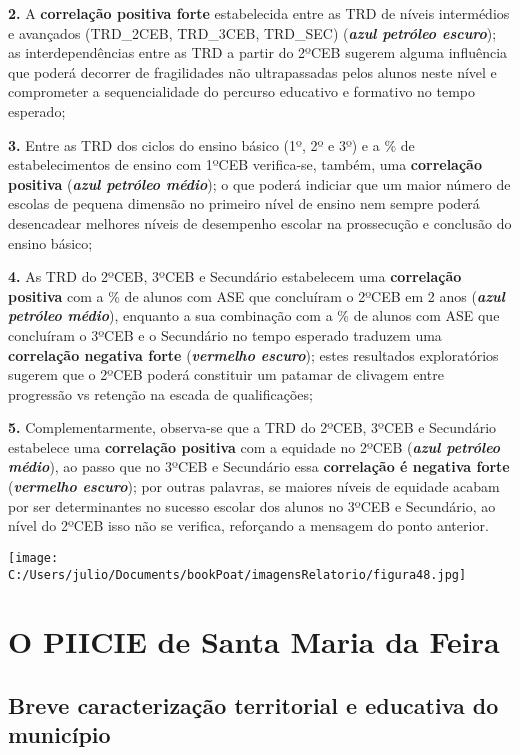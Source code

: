 \documentclass[
]{book}
\begin{document}
\textbf{2.} A \textbf{correlação positiva forte} estabelecida entre as TRD de níveis intermédios e avançados (TRD\_2CEB, TRD\_3CEB, TRD\_SEC) (\textbf{\emph{azul petróleo escuro}}); as interdependências entre as TRD a partir do 2ºCEB sugerem alguma influência que poderá decorrer de fragilidades não ultrapassadas pelos alunos neste nível e comprometer a sequencialidade do percurso educativo e formativo no tempo esperado;

\textbf{3.} Entre as TRD dos ciclos do ensino básico (1º, 2º e 3º) e a \% de estabelecimentos de ensino com 1ºCEB verifica-se, também, uma \textbf{correlação positiva} (\textbf{\emph{azul petróleo médio}}); o que poderá indiciar que um maior número de escolas de pequena dimensão no primeiro nível de ensino nem sempre poderá desencadear melhores níveis de desempenho escolar na prossecução e conclusão do ensino básico;

\textbf{4.} As TRD do 2ºCEB, 3ºCEB e Secundário estabelecem uma \textbf{correlação positiva} com a \% de alunos com ASE que concluíram o 2ºCEB em 2 anos (\textbf{\emph{azul petróleo médio}}), enquanto a sua combinação com a \% de alunos com ASE que concluíram o 3ºCEB e o Secundário no tempo esperado traduzem uma \textbf{correlação negativa forte} (\textbf{\emph{vermelho escuro}}); estes resultados exploratórios sugerem que o 2ºCEB poderá constituir um patamar de clivagem entre progressão vs retenção na escada de qualificações;

\textbf{5.} Complementarmente, observa-se que a TRD do 2ºCEB, 3ºCEB e Secundário estabelece uma \textbf{correlação positiva} com a equidade no 2ºCEB (\textbf{\emph{azul petróleo médio}}), ao passo que no 3ºCEB e Secundário essa \textbf{correlação é negativa forte} (\textbf{\emph{vermelho escuro}}); por outras palavras, se maiores níveis de equidade acabam por ser determinantes no sucesso escolar dos alunos no 3ºCEB e Secundário, ao nível do 2ºCEB isso não se verifica, reforçando a mensagem do ponto anterior.

\texttt{[image: C:/Users/julio/Documents/bookPoat/imagensRelatorio/figura48.jpg]}

\hypertarget{o-piicie-de-santa-maria-da-feira}{%
\chapter{\texorpdfstring{\textbf{O PIICIE de Santa Maria da Feira}}{O PIICIE de Santa Maria da Feira}}\label{o-piicie-de-santa-maria-da-feira}}

\hypertarget{breve-caracterizauxe7uxe3o-territorial-e-educativa-do-municuxedpio}{%
\section{\texorpdfstring{\textbf{Breve caracterização territorial e educativa do município}}{Breve caracterização territorial e educativa do município}}\label{breve-caracterizauxe7uxe3o-territorial-e-educativa-do-municuxedpio}}
\end{document}
